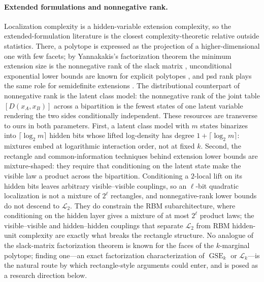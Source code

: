\documentclass{article}
\newcommand{\LC}{\mathcal{L}}
\newcommand{\GSE}{\operatorname{GSE}}
\begin{document}
\paragraph{Extended formulations and nonnegative rank.}
Localization complexity is a hidden-variable extension complexity, so the
extended-formulation literature is the closest complexity-theoretic relative
outside statistics.  There, a polytope is expressed as the projection of a
higher-dimensional one with few facets; by Yannakakis's factorization theorem
the minimum extension size is the nonnegative rank of the slack matrix
\cite{yannakakis91}, unconditional exponential lower bounds are known for
explicit polytopes \cite{fmptw15,rothvoss17}, and psd rank plays the same
role for semidefinite extensions \cite{lrs15}.  The distributional
counterpart of nonnegative rank is the latent class model: the nonnegative
rank of the joint table $[D(x_A,x_B)]$ across a bipartition is the fewest
states of one latent variable rendering the two sides conditionally
independent.  These resources are transverse to ours in both parameters.
First, a latent class model with $m$ states binarizes into
$\lceil\log_2m\rceil$ hidden bits whose lifted log-density has degree
$1+\lceil\log_2m\rceil$: mixtures embed at logarithmic interaction order, not
at fixed $k$.  Second, the rectangle and common-information techniques behind
extension lower bounds are mixture-shaped: they require that conditioning on
the latent state make the visible law a product across the bipartition.
Conditioning a $2$-local lift on its hidden bits leaves arbitrary
visible--visible couplings, so an $\ell$-bit quadratic localization is not a
mixture of $2^\ell$ rectangles, and nonnegative-rank lower bounds do not
descend to $\LC_2$.  They do constrain the RBM subarchitecture, where
conditioning on the hidden layer gives a mixture of at most $2^\ell$ product
laws; the visible--visible and hidden--hidden couplings that separate
$\LC_2$ from RBM hidden-unit complexity are exactly what breaks the rectangle
structure.  No analogue of the slack-matrix factorization theorem is known
for the faces of the $k$-marginal polytope; finding one---an exact
factorization characterization of $\GSE_k$ or $\LC_k$---is the natural route
by which rectangle-style arguments could enter, and is posed as a research
direction below.
\end{document}
